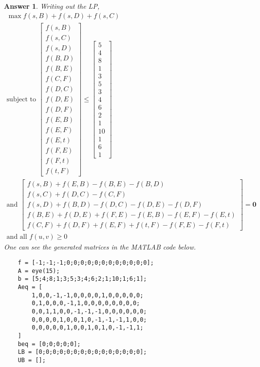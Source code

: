 \documentclass[12pt]{article}
\theoremstyle{colon}
\newtheorem*{answer}{Answer}
\begin{document}
\begin{answer}
  Writing out the LP,
  \begin{gather*}
    \max f(s,B) + f(s,D) + f(s,C) \\
    \text{subject to } \begin{bmatrix}
      f(s,B) \\
      f(s,C) \\
      f(s,D) \\
      f(B,D) \\
      f(B,E) \\
      f(C,F) \\
      f(D,C) \\
      f(D,E) \\
      f(D,F) \\
      f(E,B) \\
      f(E,F) \\
      f(E,t) \\
      f(F,E) \\
      f(F,t) \\
      f(t,F)
    \end{bmatrix} \leq \begin{bmatrix}
      5 \\
      4 \\
      8 \\
      1 \\
      3 \\
      5 \\
      3 \\
      4 \\
      6 \\
      2 \\
      1 \\
      10 \\
      1 \\
      6 \\
      1
    \end{bmatrix} \\
    \text{and } \begin{bmatrix}
      f(s,B) + f(E,B) - f(B,E) - f(B,D) \\
      f(s,C) + f(D,C) - f(C,F) \\
      f(s,D) + f(B,D) - f(D,C) - f(D,E) - f(D,F) \\
      f(B,E) + f(D,E) + f(F,E) - f(E,B) - f(E,F) - f(E,t) \\
      f(C,F) + f(D,F) + f(E,F) + f(t,F) - f(F,E) - f(F,t)
    \end{bmatrix} = \textbf{0} \\
    \text{and all } f(u,v) \geq 0
  \end{gather*}
  One can see the generated matrices in the MATLAB code below.
  \begin{verbatim}
    f = [-1;-1;-1;0;0;0;0;0;0;0;0;0;0;0;0];
    A = eye(15);
    b = [5;4;8;1;3;5;3;4;6;2;1;10;1;6;1];
    Aeq = [
        1,0,0,-1,-1,0,0,0,0,1,0,0,0,0,0;
        0,1,0,0,0,-1,1,0,0,0,0,0,0,0,0;
        0,0,1,1,0,0,-1,-1,-1,0,0,0,0,0,0;
        0,0,0,0,1,0,0,1,0,-1,-1,-1,1,0,0;
        0,0,0,0,0,1,0,0,1,0,1,0,-1,-1,1;
    ]
    beq = [0;0;0;0;0];
    LB = [0;0;0;0;0;0;0;0;0;0;0;0;0;0;0];
    UB = [];


\end{verbatim}
\end{answer}
\end{document}
